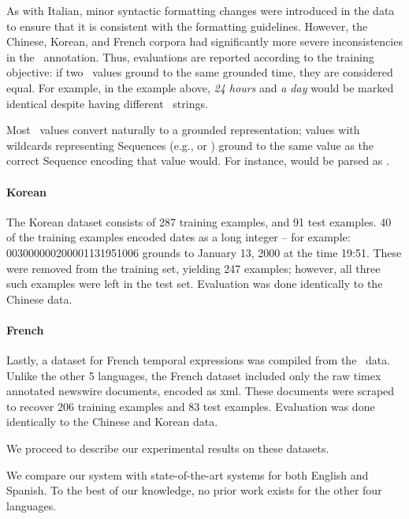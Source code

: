 As with Italian, minor syntactic formatting changes were introduced in the data
  to ensure that it is consistent with the formatting guidelines.
However, the Chinese, Korean, and French corpora had significantly more severe
  inconsistencies in the \timex\ annotation.
Thus, evaluations are reported according to the training objective: if two
  \timex\ values ground to the same grounded time, they are considered equal.
For example, in the example above, \textit{24 hours} and \textit{a day}
  would be marked identical despite having different \timex\ strings.

Most \timex\ values convert naturally to a grounded representation; values
  with wildcards representing Sequences (e.g.,  or )
  ground to the same value as the correct Sequence encoding that value would.
For instance,  would be parsed as .

\paragraph{Korean}
The Korean dataset consists of 287 training examples, and 91 test examples.
40 of the training examples encoded dates as a long integer -- for
  example: 003000000200001131951006 grounds to January 13, 2000 at the time
  19:51.
These were removed from the training set, yielding 247 examples; however,
  all three such examples were left in the test set.
Evaluation was done identically to the Chinese data.

\paragraph{French}
Lastly, a dataset for French temporal expressions was compiled from the
  \tempeval\ data.
Unlike the other 5 languages, the French dataset included only the raw 
  timex annotated newswire documents, encoded as xml.
These documents were scraped to recover 206 training examples and 83 test
  examples.
Evaluation was done identically to the Chinese and Korean data.

We proceed to describe our experimental results on these datasets.

We compare our system with state-of-the-art systems for both English and
  Spanish.
To the best of our knowledge, no prior work exists for the other four languages.

